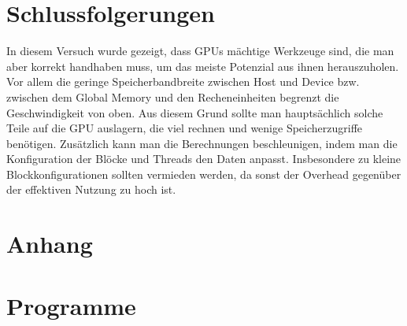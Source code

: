 \documentclass[12pt,a4paper]{scrartcl}
\begin{document}
\section{Schlussfolgerungen}
In diesem Versuch wurde gezeigt, dass GPUs m\"achtige Werkzeuge sind, die man aber korrekt handhaben muss, um das meiste Potenzial aus ihnen herauszuholen.
Vor allem die geringe Speicherbandbreite zwischen Host und Device bzw. zwischen dem Global Memory und den Recheneinheiten begrenzt die Geschwindigkeit von oben.
Aus diesem Grund sollte man haupts\"achlich solche Teile auf die GPU auslagern, die viel rechnen und wenige Speicherzugriffe ben\"otigen.
Zus\"atzlich kann man die Berechnungen beschleunigen, indem man die Konfiguration der Bl\"ocke und Threads den Daten anpasst.
Insbesondere zu kleine Blockkonfigurationen sollten vermieden werden, da sonst der Overhead gegen\"uber der effektiven Nutzung zu hoch ist.

\newpage
\section{Anhang}
\appendix
\label{anhang}

\section{Programme}
 \newpage
 \newpage
 \newpage
 \newpage
 \newpage
 \newpage

\end{document}
